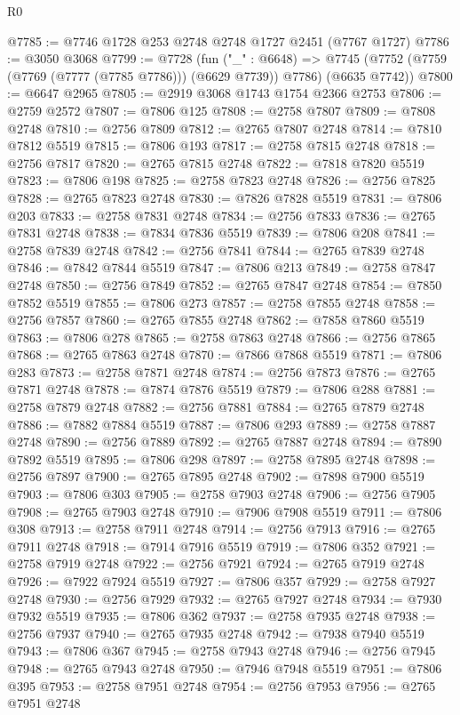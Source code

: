 \begin{lexlean}{R0}
\begin{coremodule}
@7785 := @7746 @1728 @253 @2748 @2748 @1727 @2451 (@7767 @1727)
@7786 := @3050 @3068
@7799 := @7728
    (fun ("_" : @6648) =>
    @7745 (@7752 (@7759 (@7769 (@7777 (@7785 @7786))) (@6629 @7739)) @7786) (@6635 @7742))
@7800 := @6647 @2965
@7805 := @2919 @3068 @1743 @1754 @2366 @2753
@7806 := @2759 @2572
@7807 := @7806 @125
@7808 := @2758 @7807
@7809 := @7808 @2748
@7810 := @2756 @7809
@7812 := @2765 @7807 @2748
@7814 := @7810 @7812 @5519
@7815 := @7806 @193
@7817 := @2758 @7815 @2748
@7818 := @2756 @7817
@7820 := @2765 @7815 @2748
@7822 := @7818 @7820 @5519
@7823 := @7806 @198
@7825 := @2758 @7823 @2748
@7826 := @2756 @7825
@7828 := @2765 @7823 @2748
@7830 := @7826 @7828 @5519
@7831 := @7806 @203
@7833 := @2758 @7831 @2748
@7834 := @2756 @7833
@7836 := @2765 @7831 @2748
@7838 := @7834 @7836 @5519
@7839 := @7806 @208
@7841 := @2758 @7839 @2748
@7842 := @2756 @7841
@7844 := @2765 @7839 @2748
@7846 := @7842 @7844 @5519
@7847 := @7806 @213
@7849 := @2758 @7847 @2748
@7850 := @2756 @7849
@7852 := @2765 @7847 @2748
@7854 := @7850 @7852 @5519
@7855 := @7806 @273
@7857 := @2758 @7855 @2748
@7858 := @2756 @7857
@7860 := @2765 @7855 @2748
@7862 := @7858 @7860 @5519
@7863 := @7806 @278
@7865 := @2758 @7863 @2748
@7866 := @2756 @7865
@7868 := @2765 @7863 @2748
@7870 := @7866 @7868 @5519
@7871 := @7806 @283
@7873 := @2758 @7871 @2748
@7874 := @2756 @7873
@7876 := @2765 @7871 @2748
@7878 := @7874 @7876 @5519
@7879 := @7806 @288
@7881 := @2758 @7879 @2748
@7882 := @2756 @7881
@7884 := @2765 @7879 @2748
@7886 := @7882 @7884 @5519
@7887 := @7806 @293
@7889 := @2758 @7887 @2748
@7890 := @2756 @7889
@7892 := @2765 @7887 @2748
@7894 := @7890 @7892 @5519
@7895 := @7806 @298
@7897 := @2758 @7895 @2748
@7898 := @2756 @7897
@7900 := @2765 @7895 @2748
@7902 := @7898 @7900 @5519
@7903 := @7806 @303
@7905 := @2758 @7903 @2748
@7906 := @2756 @7905
@7908 := @2765 @7903 @2748
@7910 := @7906 @7908 @5519
@7911 := @7806 @308
@7913 := @2758 @7911 @2748
@7914 := @2756 @7913
@7916 := @2765 @7911 @2748
@7918 := @7914 @7916 @5519
@7919 := @7806 @352
@7921 := @2758 @7919 @2748
@7922 := @2756 @7921
@7924 := @2765 @7919 @2748
@7926 := @7922 @7924 @5519
@7927 := @7806 @357
@7929 := @2758 @7927 @2748
@7930 := @2756 @7929
@7932 := @2765 @7927 @2748
@7934 := @7930 @7932 @5519
@7935 := @7806 @362
@7937 := @2758 @7935 @2748
@7938 := @2756 @7937
@7940 := @2765 @7935 @2748
@7942 := @7938 @7940 @5519
@7943 := @7806 @367
@7945 := @2758 @7943 @2748
@7946 := @2756 @7945
@7948 := @2765 @7943 @2748
@7950 := @7946 @7948 @5519
@7951 := @7806 @395
@7953 := @2758 @7951 @2748
@7954 := @2756 @7953
@7956 := @2765 @7951 @2748

\end{coremodule}
\end{lexlean}
